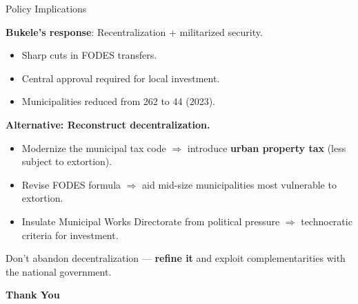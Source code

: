 \documentclass[10pt, hyperref={pdfpagelabels=false}]{beamer}
\begin{document}
\begin{frame}{Policy Implications}

\textbf{Bukele's response}: Recentralization + militarized security.
\begin{itemize}
\item Sharp cuts in FODES transfers.
\item Central approval required for local investment.
\item Municipalities reduced from 262 to 44 (2023).
\end{itemize}

\pause
\bigskip

\textbf{Alternative: Reconstruct decentralization.}
\begin{itemize}
\item Modernize the municipal tax code $\Rightarrow$ introduce \textcolor{myblue}{\textbf{urban property tax}} (less subject to extortion).
\item Revise FODES formula $\Rightarrow$ aid mid-size municipalities most vulnerable to extortion.
\item Insulate Municipal Works Directorate from political pressure $\Rightarrow$ technocratic criteria for investment.
\end{itemize}

\pause
\bigskip

\begin{block}{}
Don't abandon decentralization --- \textbf{refine it} and exploit complementarities with the national government.
\end{block}

\end{frame}


\begin{frame}
\vfill
\begin{center}
{\Large \textcolor{myblue}{\textbf{Thank You}}}

\end{center}
\vfill
\end{frame}
\end{document}

